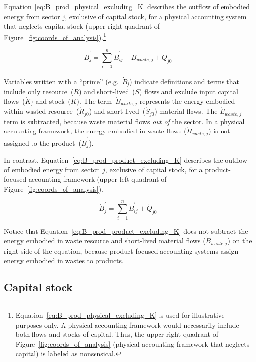 Equation~\ref{eq:B_prod_physical_excluding_K} 
describes the outflow of embodied energy from sector $j$, 
exclusive of capital stock, 
for a physical accounting system 
that neglects capital stock (upper-right quadrant of Figure~\ref{fig:coords_of_analysis}).\footnote{Equation~\ref{eq:B_prod_physical_excluding_K} 
	is used for illustrative purposes only. 
	A physical accounting framework would necessarily 
	include both flows and stocks of capital.
	Thus, the upper-right quadrant of Figure~\ref{fig:coords_of_analysis}
	(physical accounting framework that neglects capital)
	is labeled as nonsensical.}

\begin{equation} \label{eq:B_prod_physical_excluding_K}
	\dot{B}_{j}^{'}
	= \sum\limits_{i=1}^{n} \dot{B}_{ij}^{'} 
	- \dot{B}_{waste,j}
	+ \dot{Q}_{j0}
\end{equation}

\noindent{}Variables written with a ``prime''
(e.g.~$\dot{B}_{j}^{'}$) indicate definitions and terms that include only 
resource~($\dot{R}$) and short-lived~($\dot{S}$) flows 
and exclude input capital flows~($\dot{K}$) and stock~($K$).
The term~$\dot{B}_{waste,j}$ represents the energy embodied 
within wasted resource~($\dot{R}_{j0}$) 
and short-lived~($\dot{S}_{j0}$) material flows.
The $\dot{B}_{waste,j}$ term is subtracted, because waste material flows \emph{out of}
the sector. 
In a physical accounting framework, the energy embodied 
in waste flows ($\dot{B}_{waste,j}$)
is not assigned to the product~($\dot{B}_{j}^{'}$).

In contrast, Equation~\ref{eq:B_prod_product_excluding_K} describes the outflow 
of embodied energy from sector~$j$,
exclusive of capital stock,
for a product-focused accounting framework 
(upper left quadrant of Figure~\ref{fig:coords_of_analysis}).

\begin{equation} \label{eq:B_prod_product_excluding_K}
	\dot{B}_{j}^{'}
	= \sum\limits_{i=1}^{n} \dot{B}_{ij}^{'} 
	+ \dot{Q}_{j0}
\end{equation}

\noindent{}Notice that Equation~\ref{eq:B_prod_product_excluding_K} 
does not subtract the energy embodied in waste resource and short-lived material
flows ($\dot{B}_{waste,j}$) on the right side of the equation, 
because product-focused accounting systems assign energy embodied in wastes
to products.


\subsection{Capital stock}
\label{sec:capital_stock}

